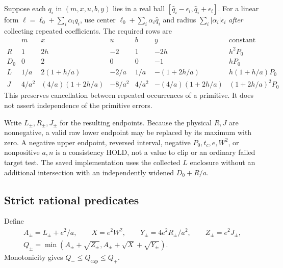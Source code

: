 \documentclass[11pt,a4paper]{article}
\newcommand{\Qcap}{Q_{\mathrm{cap}}}
\newcommand{\hold}{\textsf{HOLD}}
\theoremstyle{definition}
\theoremstyle{remark}
\numberwithin{equation}{section}
\begin{document}
Suppose each $q_i$ in $(m,x,u,b,y)$ lies in a real ball
$[\widehat q_i-\epsilon_i,\widehat q_i+\epsilon_i]$.
For a linear form $\ell=\ell_0+\sum_i\alpha_iq_i$, use center
$\ell_0+\sum_i\alpha_i\widehat q_i$ and radius
$\sum_i|\alpha_i|\epsilon_i$ \emph{after} collecting repeated
coefficients. The required rows are
\[
\begin{array}{c|ccccc|c}
 &m&x&u&b&y&\text{constant}\\ \hline
 R&1&2h&-2&1&-2h&h^2P_0\\
 D_0&0&2&0&0&-1&hP_0\\
 L&1/a&2(1+h/a)&-2/a&1/a&-(1+2h/a)&h(1+h/a)P_0\\
 J&4/a^2&(4/a)(1+2h/a)&-8/a^2&4/a^2&
             -(4/a)(1+2h/a)&(1+2h/a)^2P_0
\end{array}
\]
This preserves cancellation between repeated occurrences of a primitive.
It does not assert independence of the primitive errors.

Write $L_\pm,R_\pm,J_\pm$ for the resulting endpoints. Because the
physical $R,J$ are nonnegative, a valid raw lower endpoint may be replaced
by its maximum with zero. A negative upper endpoint, reversed interval,
negative $P_0,t_c,e,W^2$, or nonpositive $a,n$ is a consistency
\hold, not a value to clip or an ordinary failed target test.
The saved implementation uses the collected $L$ enclosure without an
additional intersection with an independently widened $D_0+R/a$.

\subsection{Strict rational predicates}

Define
\begin{equation}\label{eq:symbolic}
\begin{gathered}
 A_\pm=L_\pm+e^2/a,\qquad X=e^2W^2,\qquad
 Y_\pm=4e^2R_\pm/a^2,\qquad Z_\pm=e^2J_\pm,\\
 Q_\pm=\min(A_\pm+\sqrt{Z_\pm},
                   A_\pm+\sqrt X+\sqrt{Y_\pm}).
\end{gathered}
\end{equation}
Monotonicity gives $Q_-\le\Qcap\le Q_+$.
\end{document}
